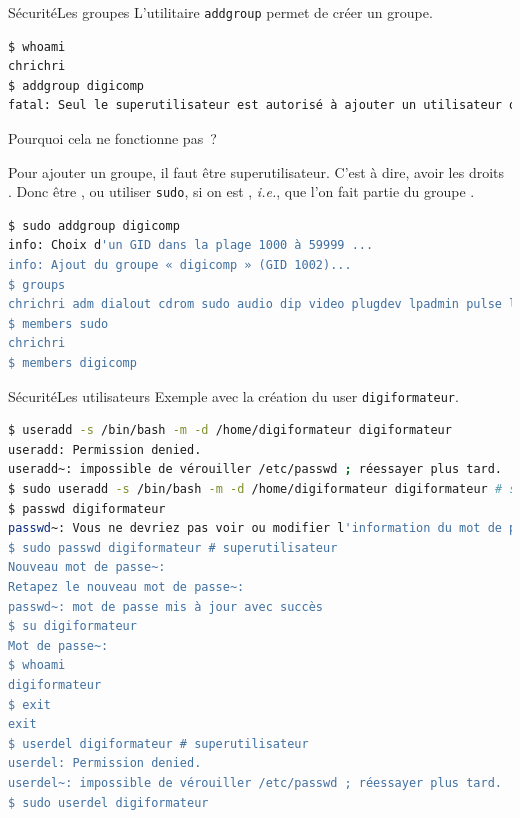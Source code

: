 \documentclass{beamer}
\begin{document}
    \begin{frame}[fragile]{Sécurité}{Les groupes}
        L'utilitaire \lstinline{addgroup} permet de créer un groupe.
        \begin{lstlisting}[language=bash]
$ whoami
chrichri
$ addgroup digicomp
fatal: Seul le superutilisateur est autorisé à ajouter un utilisateur ou un groupe au système.
        \end{lstlisting}
        Pourquoi cela ne fonctionne pas~?
        \pause
        \begin{dangercolorbox}
            Pour ajouter un groupe, il faut être superutilisateur.
            C'est à dire, avoir les droits .
            Donc être , ou utiliser \lstinline{sudo}, si on est , \textit{i.e.}, que l'on fait partie du groupe .
        \end{dangercolorbox}
        \begin{lstlisting}[language=bash]
$ sudo addgroup digicomp
info: Choix d'un GID dans la plage 1000 à 59999 ...
info: Ajout du groupe « digicomp » (GID 1002)...
$ groups
chrichri adm dialout cdrom sudo audio dip video plugdev lpadmin pulse lxd sambashare docker libvirt nordvpn
$ members sudo
chrichri
$ members digicomp
        \end{lstlisting}
    \end{frame}

    \begin{frame}[fragile]{Sécurité}{Les utilisateurs}
        Exemple avec la création du user \lstinline{digiformateur}.
        \begin{lstlisting}[language=bash]
$ useradd -s /bin/bash -m -d /home/digiformateur digiformateur
useradd: Permission denied.
useradd~: impossible de vérouiller /etc/passwd ; réessayer plus tard.
$ sudo useradd -s /bin/bash -m -d /home/digiformateur digiformateur # sudo
$ passwd digiformateur
passwd~: Vous ne devriez pas voir ou modifier l'information du mot de passe pour digiformateur.
$ sudo passwd digiformateur # superutilisateur
Nouveau mot de passe~:
Retapez le nouveau mot de passe~:
passwd~: mot de passe mis à jour avec succès
$ su digiformateur
Mot de passe~:
$ whoami
digiformateur
$ exit
exit
$ userdel digiformateur # superutilisateur
userdel: Permission denied.
userdel~: impossible de vérouiller /etc/passwd ; réessayer plus tard.
$ sudo userdel digiformateur
        \end{lstlisting}
    \end{frame}
\end{document}
